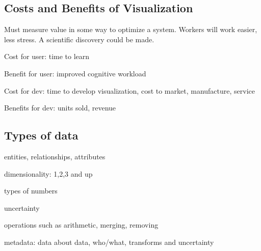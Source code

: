 \begin{mdframed}\begin{multicols}{2}
\subsection{Costs and Benefits of Visualization}

\begin{compactdesc}
\item[Must measure value] in some way to optimize a system. Workers will work
    easier, less stress. A scientific discovery could be made.
\item[Cost for user:] time to learn
\item[Benefit for user:] improved cognitive workload
\item[Cost for dev:] time to develop visualization, cost to market,
    manufacture, service
\item[Benefits for dev:] units sold, revenue
\end{compactdesc}

\subsection{Types of data}
\begin{compactenum}
\item entities, relationships, attributes
\item dimensionality: 1,2,3 and up
\item types of numbers
\item uncertainty
\item operations such as arithmetic, merging, removing
\item metadata: data about data, who/what, transforms and uncertainty
\end{compactenum}


\end{multicols}\end{mdframed}

